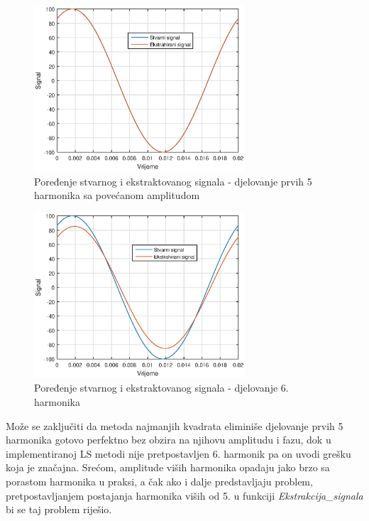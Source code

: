 \begin{figure}[H]
  \centering
  \includegraphics[width=0.7\textwidth]{Slike_rezultati/Test_h2.eps}
  \caption{Poređenje stvarnog i ekstraktovanog signala - djelovanje prvih 5 harmonika sa povećanom amplitudom}
  \label{fig:52}
\end{figure}

\begin{figure}[H]
  \centering
  \includegraphics[width=0.7\textwidth]{Slike_rezultati/Test_h3.eps}
  \caption{Poređenje stvarnog i ekstraktovanog signala - djelovanje 6. harmonika}
  \label{fig:53}
\end{figure}

Može se zaključiti da metoda najmanjih kvadrata eliminiše djelovanje prvih 5 harmonika gotovo perfektno bez obzira na njihovu amplitudu i fazu, dok u implementiranoj LS metodi nije pretpostavljen 6. harmonik pa on uvodi grešku koja je značajna. Srećom, amplitude viših harmonika opadaju jako brzo sa porastom harmonika u praksi, a čak ako i dalje predstavljaju problem, pretpostavljanjem postajanja harmonika viših od 5. u funkciji \textit{Ekstrakcija\_signala} bi se taj problem riješio.

